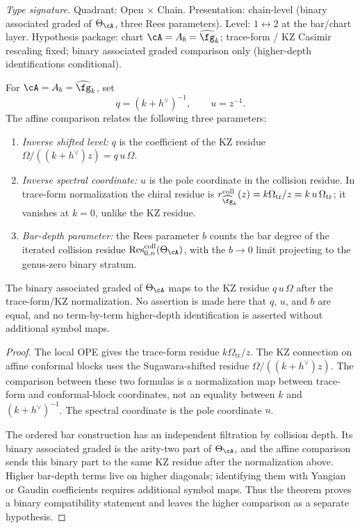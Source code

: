 \begin{theorem}
\label{thm:hdm-hbar-three-identification}
\emph{Type signature.} Quadrant: Open $\times$ Chain. Presentation:
chain-level (binary associated graded of $\Theta_\cA$, three
Rees parameters). Level: $1\leftrightarrow 2$ at the bar/chart layer.
Hypothesis package: chart $\cA = A_b = \widehat{\fg}_k$; trace-form /
KZ Casimir rescaling fixed; binary associated graded comparison only
(higher-depth identifications conditional).

For $\cA = A_b = \widehat{\fg}_k$, set
\[
  q=(k+h^\vee)^{-1},\qquad u=z^{-1}.
\]
The affine comparison relates the following three parameters:
\begin{enumerate}[label=\textup{(\roman*)}]
\item \emph{Inverse shifted level:} $q$ is the coefficient of the KZ
 residue $\Omega/((k+h^\vee)z)=q\,u\,\Omega$.
\item \emph{Inverse spectral coordinate:} $u$ is the pole coordinate in
 the collision residue. In trace-form normalization the chiral residue
 is $r^{\mathrm{coll}}_{\widehat{\fg}_k}(z)=k\Omega_{\mathrm{tr}}/z
 =k\,u\,\Omega_{\mathrm{tr}}$; it vanishes at $k=0$, unlike the KZ
 residue.
\item \emph{Bar-depth parameter:} the Rees parameter $b$ counts the bar
 degree of the iterated collision residue
 $\mathrm{Res}^{\mathrm{coll}}_{0,n}(\Theta_\cA)$, with the
 $b \to 0$ limit projecting to the genus-zero binary stratum.
\end{enumerate}
The binary associated graded of $\Theta_\cA$ maps to the KZ residue
$q\,u\,\Omega$ after the trace-form/KZ normalization. No assertion is
made here that $q$, $u$, and $b$ are equal, and no term-by-term
higher-depth identification is asserted without additional symbol maps.
\end{theorem}

\begin{proof}
The local OPE gives the trace-form residue
$k\Omega_{\mathrm{tr}}/z$. The KZ connection on affine conformal blocks
uses the Sugawara-shifted residue $\Omega/((k+h^\vee)z)$. The comparison
between these two formulas is a normalization map between trace-form
and conformal-block coordinates, not an equality between $k$ and
$(k+h^\vee)^{-1}$. The spectral coordinate is the pole coordinate $u$.

The ordered bar construction has an independent filtration by collision
depth. Its binary associated graded is the arity-two part of
$\Theta_\cA$, and the affine comparison sends this binary part to the
same KZ residue after the normalization above. Higher bar-depth terms
live on higher diagonals; identifying them with Yangian or Gaudin
coefficients requires additional symbol maps. Thus the theorem proves a
binary compatibility statement and leaves the higher comparison as a
separate hypothesis.
\end{proof}

